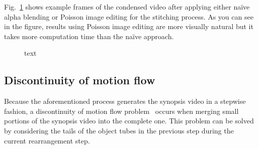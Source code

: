 \documentclass[11pt]{hyu_thesis}
\begin{document}
Fig.~\ref{fig:poisson_fg_bg} shows example frames of the condensed video after applying either na\"ive alpha blending or Poisson image editing for the stitching process. As you can see in the figure, results using Poisson image editing are more visually natural but it takes more computation time than the na\"ive approach.
\begin{figure}
	\centering
	\caption{text}
	\label{fig:poisson_fg_bg}
\end{figure}

\subsection{Discontinuity of motion flow}
Because the aforementioned process generates the synopsis video in a stepwise fashion, a discontinuity of motion flow problem~\cite{Fu2014} occurs when merging small portions of the synopsis video into the complete one. This problem can be solved by considering the tails of the object tubes in the previous step during the current rearrangement step.
\end{document}
